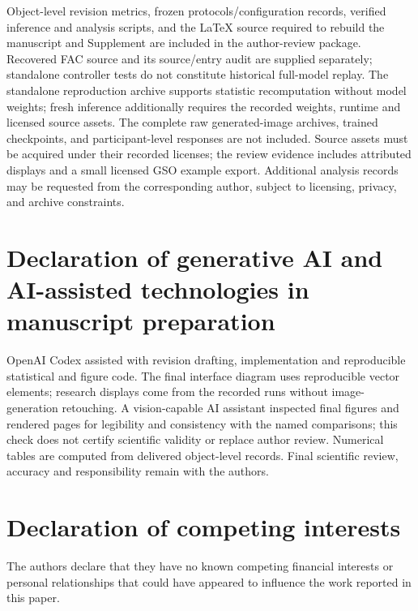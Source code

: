 \documentclass[times,twocolumn,final]{elsarticle}
\begin{document}
Object-level revision metrics, frozen protocols/configuration records, verified inference and analysis scripts, and the LaTeX source required to rebuild the manuscript and Supplement are included in the author-review package. Recovered FAC source and its source/entry audit are supplied separately; standalone controller tests do not constitute historical full-model replay. The standalone reproduction archive supports statistic recomputation without model weights; fresh inference additionally requires the recorded weights, runtime and licensed source assets. The complete raw generated-image archives, trained checkpoints, and participant-level responses are not included. Source assets must be acquired under their recorded licenses; the review evidence includes attributed displays and a small licensed GSO example export. Additional analysis records may be requested from the corresponding author, subject to licensing, privacy, and archive constraints.

\section*{Declaration of generative AI and AI-assisted technologies in manuscript preparation}
OpenAI Codex assisted with revision drafting, implementation and reproducible statistical and figure code. The final interface diagram uses reproducible vector elements; research displays come from the recorded runs without image-generation retouching. A vision-capable AI assistant inspected final figures and rendered pages for legibility and consistency with the named comparisons; this check does not certify scientific validity or replace author review. Numerical tables are computed from delivered object-level records. Final scientific review, accuracy and responsibility remain with the authors.

\section*{Declaration of competing interests}

The authors declare that they have no known competing financial interests or personal relationships that could have appeared to influence the work reported in this paper.
\end{document}
